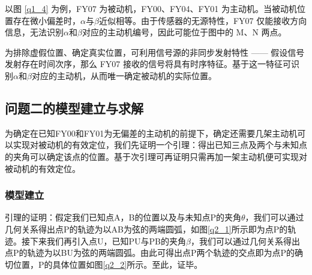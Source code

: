 \documentclass[withoutpreface,bwprint]{cumcmthesis} %
\begin{document}
以图 \ref{q1_4} 为例，FY07 为被动机，FY00、FY04、FY01 为主动机。当被动机位置存在微小偏差时，$\alpha$与$\beta$近似相等。由于传感器的无源特性，FY07 仅能接收方向信息，无法识别$\alpha$和$\beta$对应的主动机编号，因此可能位于图中的 M、N 两点。

为排除虚假位置、确定真实位置，可利用信号源的非同步发射特性 —— 假设信号发射存在时间次序，那么 FY07 接收的信号将具有时序特征。基于这一特征可识别$\alpha$和$\beta$对应的主动机，从而唯一确定被动机的实际位置。


\subsection{问题二的模型建立与求解}
为确定在已知FY00和FY01为无偏差的主动机的前提下，确定还需要几架主动机可以实现对被动机的有效定位，我们先证明一个引理：得出已知三点及两个与未知点的夹角可以确定该点的位置。基于次引理可再证明只需再加一架主动机便可实现对被动机的有效定位。
\subsubsection{模型建立}
引理的证明：假定我们已知点A，B的位置以及与未知点P的夹角$\theta$，我们可以通过几何关系得出点P的轨迹为以AB为弦的两端圆弧，如图\ref{q2_1}所示即为点P的轨迹。接下来我们再引入点U，已知PU与PB的夹角$\beta$，我们可以通过几何关系得出点P的轨迹为以BU为弦的两端圆弧。由此可得出点P两个轨迹的交点即为点P的确切位置，P的具体位置如图\ref{q2_2}所示。至此，证毕。
\end{document}
